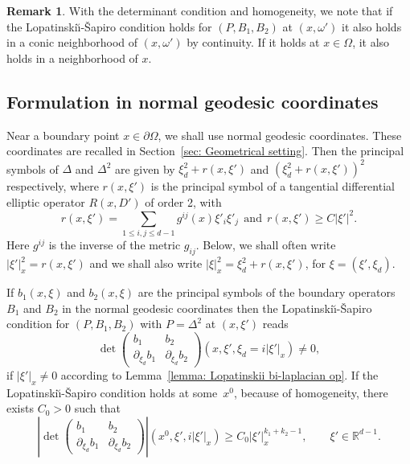 \documentclass[JEP,XML,SOM,Unicode,published]{cedram}
\theoremstyle{plain}
\theoremstyle{definition}
\newtheorem{remark}[theorem]{Remark}
\def\R{\mathbb{R}}
\newcommand{\LS}{Lopatinski\u{\i}-\v{S}apiro\xspace}
\begin{document}
\begin{remark}\label{RR0}
With the determinant condition and homogeneity, we note that if the
\LS condition holds for $(P,B_1, B_2)$ at $(x,\omega')$ it also holds
in a conic neighborhood of $(x,\omega')$ by continuity. If it holds at $x\in\Omega$, it also holds in a neighborhood of $x$.
\end{remark}

\subsection{Formulation in normal geodesic coordinates}
Near a boundary point $x\in\partial\Omega$, we shall use normal
geodesic coordinates. These coordinates are recalled in
Section~\ref{sec: Geometrical setting}. Then the principal symbols of $\Delta$ and
$\Delta^2$ are given by $\xi_d^2+r(x,\xi')$ and
$(\xi_d^2+r(x,\xi'))^2$ respectively, where $r(x,\xi')$ is the
principal symbol of a tangential differential elliptic operator
$R(x,D')$ of order 2, with
\[
r(x,\xi')=\sum_{1\leq i,j\leq
d-1}g^{ij}(x)\xi'_i\xi'_j \ \ \text{and} \ \ r(x,\xi')\geq C|\xi'|^2.
\]
Here $g^{ij}$ is the inverse of the metric $g_{ij}$. Below, we shall
often write $|\xi'|^2_x=r(x,\xi')$ and we shall also write
$|\xi|^2_x=\xi_d^2+r(x,\xi')$, for $\xi=(\xi',\xi_d)$.

If $b_1(x,\xi)$ and $b_2(x,\xi)$ are the principal symbols of the
boundary operators $B_1$ and $B_2$ in the normal geodesic
coordinates then the \LS condition for $(P, B_1, B_2)$ with $P =
\Delta^2$ at $(x,\xi')$ reads
\begin{equation*}
\det
\begin{pmatrix}
b_1&b_2\\[
2pt]
\partial_{\xi_d}b_1& \partial_{\xi_d}b_2
\end{pmatrix}(x,\xi',\xi_d=i |\xi'|_x)
\neq 0,
\end{equation*}
if $|\xi'|_x \neq 0$ according to Lemma~\ref{lemma: Lopatinskii bi-laplacian op}. If the \LS condition holds at some~$x^0$,
because of homogeneity, there exists $C_0>0$ such that
\begin{equation}\label{eq: homog formul LS condition}
\left|\det
\begin{pmatrix}
b_1 &b_2\\[
2pt]
\partial_{\xi_d}b_1& \partial_{\xi_d}b_2
\end{pmatrix}\right|(x^0,\xi',i |\xi'|_x)
\geq C_0 |\xi'|_x^{k_1+k_2 -1},
\qquad \xi' \in \R^{d-1}.
\end{equation}
\end{document}
